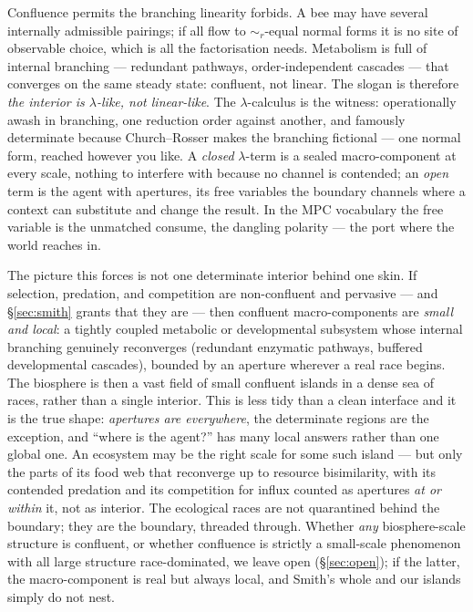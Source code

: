 \documentclass[11pt]{article}
\theoremstyle{definition}
\theoremstyle{plain}
\theoremstyle{remark}
\newcommand{\rbisim}{\sim_{r}}
\begin{document}
\noindent
Confluence permits the branching linearity forbids. A bee may have several
internally admissible pairings; if all flow to $\rbisim$-equal normal forms it is no
site of observable choice, which is all the factorisation needs. Metabolism is full of
internal branching --- redundant pathways, order-independent cascades --- that
converges on the same steady state: confluent, not linear. The slogan is therefore
\emph{the interior is $\lambda$-like, not linear-like}. The $\lambda$-calculus is the
witness: operationally awash in branching, one reduction order against another, and
famously determinate because Church--Rosser makes the branching fictional --- one
normal form, reached however you like. A \emph{closed} $\lambda$-term is a sealed
macro-component at every scale, nothing to interfere with because no channel is
contended; an \emph{open} term is the agent with apertures, its free variables the
boundary channels where a context can substitute and change the result. In the MPC
vocabulary the free variable is the unmatched consume, the dangling polarity --- the
port where the world reaches in.

The picture this forces is not one determinate interior behind one skin. If selection,
predation, and competition are non-confluent and pervasive --- and \S\ref{sec:smith}
grants that they are --- then confluent macro-components are \emph{small and local}: a
tightly coupled metabolic or developmental subsystem whose internal branching genuinely
reconverges (redundant enzymatic pathways, buffered developmental cascades), bounded by
an aperture wherever a real race begins. The biosphere is then a vast field of small
confluent islands in a dense sea of races, rather than a single interior. This is less
tidy than a clean interface and it is the true shape: \emph{apertures are everywhere},
the determinate regions are the exception, and ``where is the agent?'' has many local
answers rather than one global one. An ecosystem may be the right scale for some such
island --- but only the parts of its food web that reconverge up to resource
bisimilarity, with its contended predation and its competition for influx counted as
apertures \emph{at or within} it, not as interior. The ecological races are not
quarantined behind the boundary; they are the boundary, threaded through. Whether
\emph{any} biosphere-scale structure is confluent, or whether confluence is strictly a
small-scale phenomenon with all large structure race-dominated, we leave open
(\S\ref{sec:open}); if the latter, the macro-component is real but always local, and
Smith's whole and our islands simply do not nest.
\end{document}
